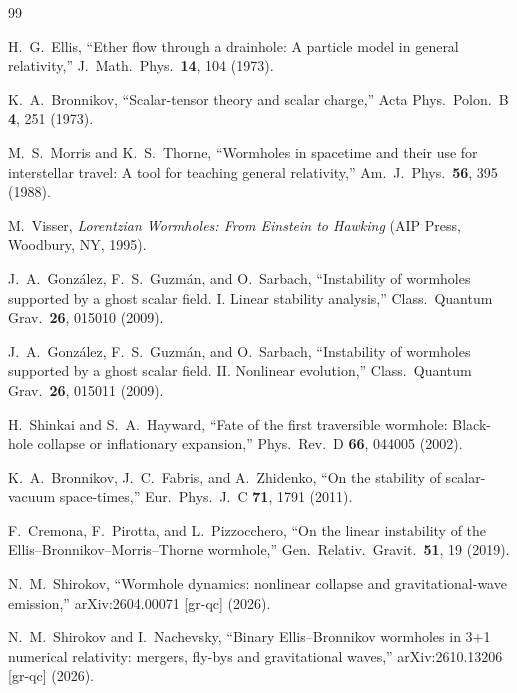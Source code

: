\documentclass[twocolumn,floatfix,aps,prd,superscriptaddress,nofootinbib]{revtex4-2}
\begin{document}
\begin{thebibliography}{99}

H.~G.~Ellis,
\newblock ``Ether flow through a drainhole: A particle model in general relativity,''
\newblock J.\ Math.\ Phys.\ \textbf{14}, 104 (1973).

K.~A.~Bronnikov,
\newblock ``Scalar-tensor theory and scalar charge,''
\newblock Acta Phys.\ Polon.\ B \textbf{4}, 251 (1973).

M.~S.~Morris and K.~S.~Thorne,
\newblock ``Wormholes in spacetime and their use for interstellar travel: A tool for teaching general relativity,''
\newblock Am.\ J.\ Phys.\ \textbf{56}, 395 (1988).

M.~Visser,
\newblock \emph{Lorentzian Wormholes: From Einstein to Hawking}
\newblock (AIP Press, Woodbury, NY, 1995).

J.~A.~Gonz\'alez, F.~S.~Guzm\'an, and O.~Sarbach,
\newblock ``Instability of wormholes supported by a ghost scalar field. I. Linear stability analysis,''
\newblock Class.\ Quantum Grav.\ \textbf{26}, 015010 (2009).

J.~A.~Gonz\'alez, F.~S.~Guzm\'an, and O.~Sarbach,
\newblock ``Instability of wormholes supported by a ghost scalar field. II. Nonlinear evolution,''
\newblock Class.\ Quantum Grav.\ \textbf{26}, 015011 (2009).

H.~Shinkai and S.~A.~Hayward,
\newblock ``Fate of the first traversible wormhole: Black-hole collapse or inflationary expansion,''
\newblock Phys.\ Rev.\ D \textbf{66}, 044005 (2002).

K.~A.~Bronnikov, J.~C.~Fabris, and A.~Zhidenko,
\newblock ``On the stability of scalar-vacuum space-times,''
\newblock Eur.\ Phys.\ J.\ C \textbf{71}, 1791 (2011).

F.~Cremona, F.~Pirotta, and L.~Pizzocchero,
\newblock ``On the linear instability of the Ellis--Bronnikov--Morris--Thorne wormhole,''
\newblock Gen.\ Relativ.\ Gravit.\ \textbf{51}, 19 (2019).

N.~M.~Shirokov,
\newblock ``Wormhole dynamics: nonlinear collapse and gravitational-wave emission,''
\newblock arXiv:2604.00071 [gr-qc] (2026).

N.~M.~Shirokov and I.~Nachevsky,
\newblock ``Binary Ellis--Bronnikov wormholes in 3+1 numerical relativity: mergers, fly-bys and gravitational waves,''
\newblock arXiv:2610.13206 [gr-qc] (2026).


\end{thebibliography}
\end{document}
